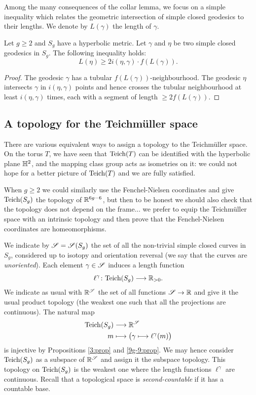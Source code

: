 Among the many consequences of the collar lemma, we focus on a simple inequality which relates the geometric intersection of simple closed geodesics to their lengths. We denote by $L(\gamma)$ the length of $\gamma$.

\begin{cor}  \label{strizza:cor}
Let $g\geqslant 2$ and $S_g$ have a hyperbolic metric. Let $\gamma$ and $\eta$ be two simple closed geodesics in $S_g$. The following inequality holds:
$$L(\eta)\geqslant 2i(\eta, \gamma) \cdot f(L(\gamma)).$$
\end{cor}
\begin{proof}
The geodesic $\gamma$ has a tubular $f(L(\gamma))$-neighbourhood. The geodesic $\eta$ intersects $\gamma$ in $i(\eta,\gamma)$ points and hence crosses the tubular neighbourhood at least $i(\eta,\gamma)$ times, each with a segment of length $\geqslant 2f(L(\gamma))$.
\end{proof}

\subsection{A topology for the Teichm\"uller space} \label{Topology:Teich:subsection}
There are various equivalent ways to assign a topology to the Teichm\"uller space. 
On the torus $T$, we have seen that ${\rm Teich}(T)$ can be identified with the hyperbolic plane $\mathbb{H}^2$, and the mapping class group acts as isometries on it: we could not hope for a better picture of ${\rm Teich}(T)$ and we are fully satisfied.

When $g\geqslant 2$ we could similarly use the Fenchel-Nielsen coordinates and give ${\rm Teich}(S_g)$ the topology of $\mathbb{R}^{6g-6}$, but then to be honest we should also check that the topology does not depend on the frame... we prefer to equip the Teichm\"uller space with an intrinsic topology and then prove that the Fenchel-Nielsen coordinates are homeomorphisms.\index{$\calS$} 

We indicate by $\mathscr{S}= \mathscr{S}(S_g)$ the set of all the non-trivial simple closed curves in $S_g$, considered up to isotopy and orientation reversal (we say that the curves are \emph{unoriented}). Each element $\gamma\in\mathscr{S}$ induces a length function
$$\ell^\gamma\colon {\rm Teich}(S_g) \longrightarrow \mathbb{R}_{>0}.$$
We indicate as usual with $\mathbb{R}^\mathscr{S}$ the set of all functions $\mathscr{S} \to \mathbb{R}$ and give it the usual product topology (the weakest one such that all the projections are continuous). The natural map
\begin{align*}
{\rm Teich}(S_g) & \longrightarrow \mathbb{R}^\mathscr{S} \\
m & \longmapsto \big( \gamma \longmapsto \ell^\gamma(m) \big)
\end{align*}
is injective by Propositions \ref{3:prop} and \ref{9g-9:prop}. We may hence consider ${\rm Teich}(S_g)$ as a subspace of $\mathbb{R}^\mathscr{S}$ and assign it the subspace topology. This topology on ${\rm Teich}(S_g)$ is the weakest one where the length functions $\ell^\gamma$ are continuous.
Recall that a topological space is \emph{second-countable} if it has a countable base.

